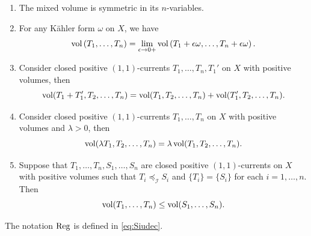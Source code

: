 \begin{lemma}\label{lma:vollinearlimit2}\leavevmode
    \begin{enumerate}
        \item\label{itm:lma:vollinearlimit2:1} The mixed volume is symmetric in its $n$-variables.
        \item\label{itm:lma:vollinearlimit2:2} For any Kähler form $\omega$ on $X$, we have
        \begin{equation}\label{eq:mix_vol_comp1}
            \operatorname{vol}\left(T_1,\ldots,T_n\right)=\lim_{\epsilon\to 0+} \operatorname{vol}\left(T_1+\epsilon\omega,\ldots,T_n+\epsilon\omega\right).
        \end{equation}
        \item\label{itm:lma:vollinearlimit2:3} Consider closed positive $(1,1)$-currents $T_1,\ldots,T_n,T_1'$ on $X$ with positive volumes, then
        \begin{equation}
            \operatorname{vol} (T_1+T_1',T_2,\ldots,T_n)=\operatorname{vol} (T_1,T_2,\ldots,T_n)+\operatorname{vol} (T_1',T_2,\ldots,T_n).
        \end{equation}
        \item\label{itm:lma:vollinearlimit2:4} Consider closed positive $(1,1)$-currents $T_1,\ldots,T_n$ on $X$ with positive volumes and $\lambda > 0$, then
        \[
        \operatorname{vol} (\lambda T_1,T_2,\ldots,T_n)=\lambda \operatorname{vol} (T_1,T_2,\ldots,T_n).
        \]
        \item\label{itm:lma:vollinearlimit2:5} Suppose that $T_1,\ldots,T_n,S_1,\ldots,S_n$ are closed positive $(1,1)$-currents on $X$ with positive volumes such that $T_i\preceq_{\mathcal{I}} S_i$ and $\{T_i\}=\{S_i\}$ for each $i=1,\ldots,n$. Then
        \begin{equation}
            \operatorname{vol}(T_1,\ldots,T_n)\leq \operatorname{vol}(S_1,\ldots,S_n).
        \end{equation}
    \end{enumerate}
\end{lemma}
The notation $\operatorname{Reg}$ is defined in \eqref{eq:Siudec}.
